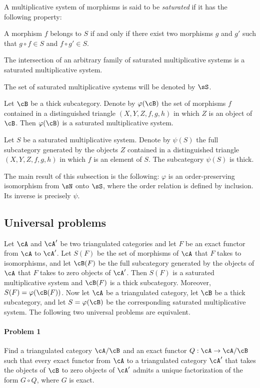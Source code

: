 \documentclass[oneside]{book}
\begin{document}
A multiplicative system of morphisms is said to be \emph{saturated} if it
has the following property:

A morphism $f$ belongs to $S$ if and only if there exist two morphisms $g$
and $g'$ such that $g\circ f\in S$ and $f\circ g'\in S$.

The intersection of an arbitrary family of saturated multiplicative
systems is a saturated multiplicative system.

The set of saturated multiplicative systems will be denoted by $\sS$.

Let $\cB$ be a thick subcategory. Denote by $\varphi(\cB)$ the set of
morphisms $f$ contained in a distinguished triangle $(X,Y,Z,f,g,h)$ in
which $Z$ is an object of $\cB$. Then $\varphi(\cB)$ is a saturated
multiplicative system.

Let $S$ be a saturated multiplicative system. Denote by $\psi(S)$ the
full subcategory generated by the objects $Z$ contained in a distinguished
triangle $(X,Y,Z,f,g,h)$ in which $f$ is an element of $S$. The
subcategory $\psi(S)$ is thick.

The main result of this subsection is the following: $\varphi$ is an
order-preserving isomorphism from $\sN$ onto $\sS$, where the order
relation is defined by inclusion. Its inverse is precisely $\psi$.

\subsection{Universal problems}\label{VIII:2-2}

Let $\cA$ and $\cA'$ be two triangulated categories and let $F$ be an exact
functor from $\cA$ to $\cA'$. Let $S(F)$ be the set of morphisms of $\cA$
that $F$ takes to isomorphisms, and let $\cB(F)$ be the full subcategory
generated by the objects of $\cA$ that $F$ takes to zero objects of
$\cA'$. Then $S(F)$ is a saturated multiplicative system and $\cB(F)$ is
a thick subcategory. Moreover, $S(F) = \varphi(\cB(F))$. Now let $\cA$ be
a triangulated category, let $\cB$ be a thick subcategory, and let
$S=\varphi(\cB)$ be the corresponding saturated multiplicative system.
The following two universal problems are equivalent.

\paragraph{Problem 1}
\hypertarget{VIII:prob1}{}
Find a triangulated category $\cA/\cB$ and an exact functor
$Q:\cA\to \cA/\cB$ such that every exact functor from $\cA$ to a
triangulated category $\cA'$ that takes the objects of $\cB$ to zero
objects of $\cA'$ admits a unique factorization of the form $G\circ Q$,
where $G$ is exact.
\end{document}

